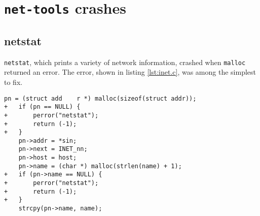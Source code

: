 \section{\texttt{net-tools} crashes}
\label{appendix:net-tools}

\subsection{netstat}
\texttt{netstat}, which prints a variety of network information, crashed when \texttt{malloc} returned an error. The error, shown in listing \ref{lst:inet.c}, was among the simplest to fix.

\begin{lstlisting}[label={lst:inet.c},firstnumber=213, caption={\texttt{lib/inet.c}}]
    pn = (struct add	r *) malloc(sizeof(struct addr));
+   if (pn == NULL) {
+   	perror("netstat");
+		return (-1);
+   }
    pn->addr = *sin;
    pn->next = INET_nn;
    pn->host = host;
    pn->name = (char *) malloc(strlen(name) + 1);
+   if (pn->name == NULL) {
+   	perror("netstat");
+		return (-1);
+   }
    strcpy(pn->name, name);
\end{lstlisting}
